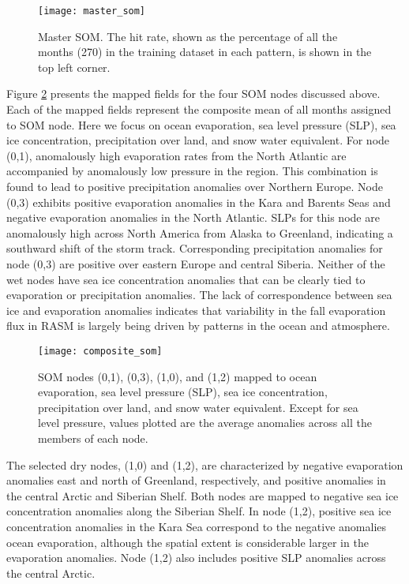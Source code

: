 \begin{figure}
  \centering
  \texttt{[image: master\_som]}
  \caption{Master SOM. The hit rate, shown as the percentage of all the months (270) in the training dataset in each pattern, is shown in the top left corner.}
  \label{fig:master_som}
\end{figure}

Figure \ref{fig:composite_som} presents the mapped fields for the four SOM nodes discussed above.
Each of the mapped fields represent the composite mean of all months assigned to SOM node.
Here we focus on ocean evaporation, sea level pressure (SLP), sea ice concentration, precipitation over land, and snow water equivalent.
For node (0,1), anomalously high evaporation rates from the North Atlantic are accompanied by anomalously low pressure in the region.
This combination is found to lead to positive precipitation anomalies over Northern Europe.
Node (0,3) exhibits positive evaporation anomalies in the Kara and Barents Seas and negative evaporation anomalies in the North Atlantic.
SLPs for this node are anomalously high across North America from Alaska to Greenland, indicating a southward shift of the storm track.
Corresponding precipitation anomalies for node (0,3) are positive over eastern Europe and central Siberia.
Neither of the wet nodes have sea ice concentration anomalies that can be clearly tied to evaporation or precipitation anomalies.
The lack of correspondence between sea ice and evaporation anomalies indicates that variability in the fall evaporation flux in RASM is largely being driven by patterns in the ocean and atmosphere.

\begin{figure}
  \centering
  \texttt{[image: composite\_som]}
  \caption{SOM nodes (0,1), (0,3), (1,0), and (1,2) mapped to ocean evaporation, sea level pressure (SLP), sea ice concentration, precipitation over land, and snow water equivalent. Except for sea level pressure, values plotted are the average anomalies across all the members of each node.}
  \label{fig:composite_som}
\end{figure}

The selected dry nodes, (1,0) and (1,2), are characterized by negative evaporation anomalies east and north of Greenland, respectively, and positive anomalies in the central Arctic and Siberian Shelf.
Both nodes are mapped to negative sea ice concentration anomalies along the Siberian Shelf.
In node (1,2), positive sea ice concentration anomalies in the Kara Sea correspond to the negative anomalies ocean evaporation, although the spatial extent is considerable larger in the evaporation anomalies.
Node (1,2) also includes positive SLP anomalies across the central Arctic.

